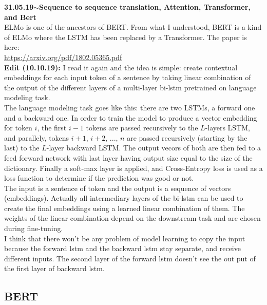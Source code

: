 \documentclass[11pt,a4paper]{article}
\newenvironment{loggentry}[2]%
{\noindent\textbf{#1}\hspace{1cm}$\mathbf{\sim}$\text{ }\textbf{#2}\\}{\vspace{0.5cm}}
\begin{document}
\begin{loggentry}{31.05.19}{Sequence to sequence translation, Attention, Transformer, and Bert}
ELMo is one of the ancestors of BERT. From what I understood, BERT is a kind of ELMo where the LSTM has been replaced by a Transformer. The paper is here:\\
\url{https://arxiv.org/pdf/1802.05365.pdf}\\
\textbf{Edit (10.10.19):} I read it again and the idea is simple: create contextual embeddings for each input token of a sentence by taking linear combination of the output of the different layers of a multi-layer bi-lstm pretrained on language modeling task.\\
The language modeling task goes like this: there are two LSTMs, a forward one and a backward one. In order to train the model to produce a vector embedding for token $i$, the first $i-1$ tokens are passed recursively to the $L$-layers LSTM, and parallely, tokens $i+1$, $i+2$, ..., $n$ are passed recursively (starting by the last) to the $L$-layer backward LSTM. The output vecors of both are then fed to a feed forward network with last layer having output size equal to the size of the dictionary. Finally a soft-max layer is applied, and Cross-Entropy loss is used as a loss function to determine if the prediction was good or not.\\
The input is a sentence of token and the output is a sequence of vectors (embeddings). Actually all intermediary layers of the bi-lstm can be used to create the final embeddings using a learned linear combination of them. The weights of the linear combination depend on the downstream task and are chosen during fine-tuning.\\
I think that there won't be any problem of model learning to copy the input because the forward lstm and the backward lstm stay separate, and receive different inputs. The second layer of the forward lstm doesn't see the out put of the first layer of backward lstm.


\subsection{BERT}


\end{loggentry}
\end{document}

